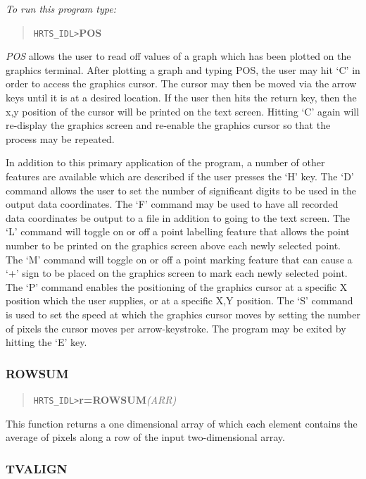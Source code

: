 {\em To run this program type:}
\begin{quote}   
      {\tt HRTS\_IDL>}{\bf POS}              
\end{quote}

{\em POS} allows the user to read off values of a graph which has been plotted
on the graphics terminal.  After plotting a graph and typing POS, the user may
hit `C' in order to access the graphics cursor.  The cursor may then be moved
via the arrow keys until it is at a desired location. If the user then hits the
return key, then the {x,y} position of the cursor will be printed on the text
screen.  Hitting `C' again will re-display the graphics screen and re-enable
the graphics cursor so that the process may be repeated.

In addition to this primary application of the program, a number of other
features are available which are described if the user presses the `H' key. 
The `D' command allows the user to set the number of significant digits to be
used in the output data coordinates.  The `F' command may be used to have all
recorded data coordinates be output to a file in addition to going to the text
screen.  The `L' command will toggle on or off a point labelling feature that
allows the point number to be printed on the graphics screen above each newly
selected point.  The `M' command will toggle on or off a point marking feature
that can cause a `+' sign to be placed on the graphics screen to mark each
newly selected point.  The `P' command enables the positioning of the graphics
cursor at a specific X position which the user supplies, or at a specific X,Y
position.  The `S' command is used to set the speed at which the graphics
cursor moves by setting the number of pixels the cursor moves per
arrow-keystroke. The program may be exited by hitting the `E' key.

\subsubsection{ROWSUM}   

\begin{quote}
     {\tt HRTS\_IDL>}{\bf r=ROWSUM}{\it (ARR)}            
\end{quote}   
This function returns a one dimensional array of which each element contains
the average of pixels along a row of the input  two-dimensional array.

\subsubsection{TVALIGN}

